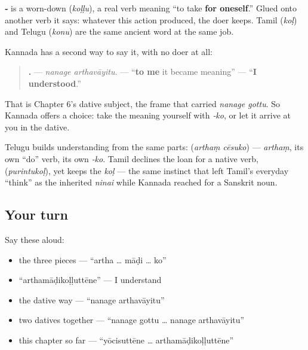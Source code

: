\begin{grammarlens}[title={Grammar Lens: ‑\kn{ಕೊ}, the ending that gives the action back}]
\textbf{‑} is a worn-down \textbf{} (\emph{koḷḷu}), a real verb meaning \textquotedblleft{}to take \textbf{for oneself}.\textquotedblright{} Glued onto another verb it says: whatever this action produced, the doer keeps. Tamil \textbf{} (\emph{koḷ}) and Telugu \textbf{} (\emph{konu}) are the same ancient word at the same job.

Kannada has a second way to say it, with no doer at all:

\begin{quote}
\textbf{ .} — \emph{nanage arthavāyitu.} — \textquotedblleft{}\textbf{to me} it became meaning\textquotedblright{} — \textquotedblleft{}\textbf{I understood}.\textquotedblright{}
\end{quote}

That is Chapter 6's dative subject, the frame that carried \emph{nanage gottu}. So Kannada offers a choice: take the meaning yourself with \emph{‑ko}, or let it arrive at you in the dative.
\end{grammarlens}

\begin{cousinweb}
Telugu builds understanding from the same parts: \textbf{ } (\emph{arthaṃ cēsuko}) — \emph{arthaṃ}, its own \textquotedblleft{}do\textquotedblright{} verb, its own \emph{‑ko}. Tamil declines the loan for a native verb, \textbf{} (\emph{purintukoḷ}), yet keeps the \emph{koḷ} — the same instinct that left Tamil's everyday \textquotedblleft{}think\textquotedblright{} as the inherited \emph{ninai} while Kannada reached for a Sanskrit noun.
\end{cousinweb}

\subsection*{Your turn}
Say these aloud:

\begin{itemize}
\raggedright
  \item the three pieces — \textquotedblleft{}artha … māḍi … ko\textquotedblright{}
  \item \textquotedblleft{}arthamāḍikoḷḷuttēne\textquotedblright{} — I understand
  \item the dative way — \textquotedblleft{}nanage arthavāyitu\textquotedblright{}
  \item two datives together — \textquotedblleft{}nanage gottu … nanage arthavāyitu\textquotedblright{}
  \item this chapter so far — \textquotedblleft{}yōcisuttēne … arthamāḍikoḷḷuttēne\textquotedblright{}
\end{itemize}

